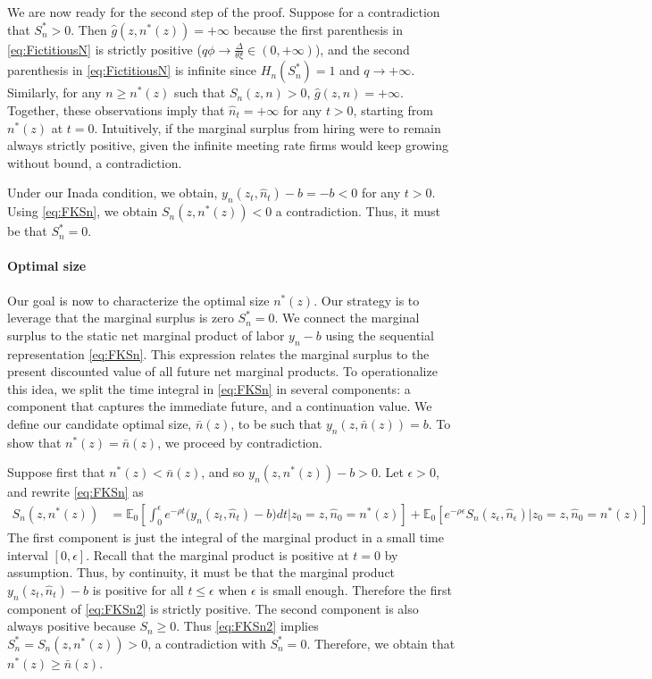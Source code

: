 We are now ready for the second step of the proof. Suppose for a contradiction that $S_n^* > 0$. Then $\hat{g}(z,n^*(z)) = + \infty$ because the first parenthesis in \eqref{eq:FictitiousN} is strictly positive ($q \phi \to \frac{\Delta}{\theta \xi} \in (0,+\infty)$), and the second parenthesis in \eqref{eq:FictitiousN} is infinite since $H_n(S_n^*) = 1$ and $q \to +\infty$. Similarly, for any $n \geq n^*(z)$ such that $S_n(z,n) > 0$, $\hat{g}(z,n) = + \infty$. Together, these observations imply that $\hat{n}_t = +\infty$ for any $t > 0$, starting from $n^*(z)$ at $t=0$. Intuitively, if the marginal surplus from hiring were to remain always strictly positive, given the infinite meeting rate firms would keep growing without bound, a contradiction.

Under our Inada condition, we obtain, $y_n(z_t,\hat{n}_t) - b = - b < 0$ for any $t > 0$. Using \eqref{eq:FKSn}, we obtain $S_n(z,n^*(z)) < 0$ a contradiction. Thus, it must be that $S_n^* = 0$.

\paragraph{Optimal size} Our goal is now to characterize the optimal size $n^*(z)$. Our strategy is to leverage that the marginal surplus is zero $S_n^* = 0$. We connect the marginal surplus to the static net marginal product of labor $y_n - b$ using the sequential representation \eqref{eq:FKSn}. This expression relates the marginal surplus to the present discounted value of all future net marginal products. To operationalize this idea, we split the time integral in \eqref{eq:FKSn} in several components: a component that captures the immediate future, and a continuation value. We define our candidate optimal size, $\bar{n}(z)$, to be such that $y_n(z,\bar{n}(z)) = b$. To show that $n^*(z) = \bar{n}(z)$, we proceed by contradiction.

Suppose first that $n^*(z) < \bar{n}(z)$, and so $y_n(z,n^*(z)) - b > 0$. Let $\epsilon > 0$, and rewrite \eqref{eq:FKSn} as
\begin{align}
\label{eq:FKSn2}
S_n(z,n^*(z)) &= \mathbb{E}_0 \left[ \int_0^{\epsilon} e^{-\rho t} \big(y_n(z_t,\hat{n}_t) - b \big) dt \Bigg| z_0 = z , \hat{n}_0 = n^*(z) \right]  + \mathbb{E}_0\left[e^{-\rho \epsilon}S_n(z_{\epsilon},\hat{n}_{\epsilon}) \Bigg| z_0 = z , \hat{n}_0 = n^*(z) \right]
\end{align}
The first component is just the integral of the marginal product in a small time interval $[0,\epsilon]$. Recall that the marginal product is positive at $t=0$ by assumption. Thus, by continuity, it must be that the marginal product $y_n(z_t,\hat{n}_t)-b$ is positive for all $t \leq \epsilon$ when $\epsilon$ is small enough. Therefore the first component of \eqref{eq:FKSn2} is strictly positive.
The second component is also always positive because $S_n \geq 0$. Thus \eqref{eq:FKSn2} implies $S_n^* = S_n(z,n^*(z))  > 0$,
a contradiction with $S_n^* = 0$. Therefore, we obtain that $n^*(z) \geq \bar{n}(z)$.

